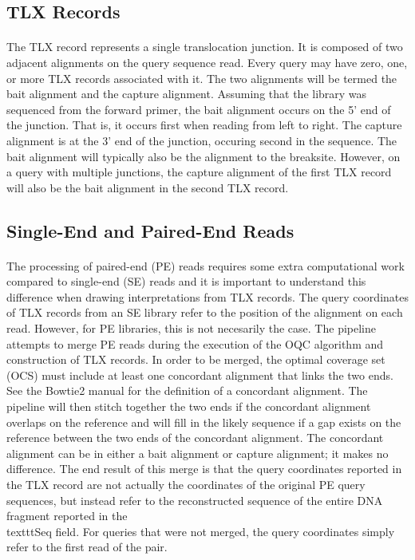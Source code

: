 \documentclass{article}
\begin{document}
\subsection{TLX Records}
\paragraph{} The TLX record represents a single translocation junction. It is composed of two adjacent alignments on the query sequence read. Every query may have zero, one, or more TLX records associated with it. The two alignments will be termed the bait alignment and the capture alignment. Assuming that the library was sequenced from the forward primer, the bait alignment occurs on the 5' end of the junction. That is, it occurs first when reading from left to right. The capture alignment is at the 3' end of the junction, occuring second in the sequence. The bait alignment will typically also be the alignment to the breaksite. However, on a query with multiple junctions, the capture alignment of the first TLX record will also be the bait alignment in the second TLX record.

\subsection{Single-End and Paired-End Reads}
\paragraph{} The processing of paired-end (PE) reads requires some extra computational work compared to single-end (SE) reads and it is important to understand this difference when drawing interpretations from TLX records. The query coordinates of TLX records from an SE library refer to the position of the alignment on each read. However, for PE libraries, this is not necesarily the case. The pipeline attempts to merge PE reads during the execution of the OQC algorithm and construction of TLX records. In order to be merged, the optimal coverage set (OCS) must include at least one concordant alignment that links the two ends. See the Bowtie2 manual for the definition of a concordant alignment. The pipeline will then stitch together the two ends if the concordant alignment overlaps on the reference and will fill in the likely sequence if a gap exists on the reference between the two ends of the concordant alignment. The concordant alignment can be in either a bait alignment or capture alignment; it makes no difference. The end result of this merge is that the query coordinates reported in the TLX record are not actually the coordinates of the original PE query sequences, but instead refer to the reconstructed sequence of the entire DNA fragment reported in the \\texttt{Seq} field. For queries that were not merged, the query coordinates simply refer to the first read of the pair.
\end{document}
